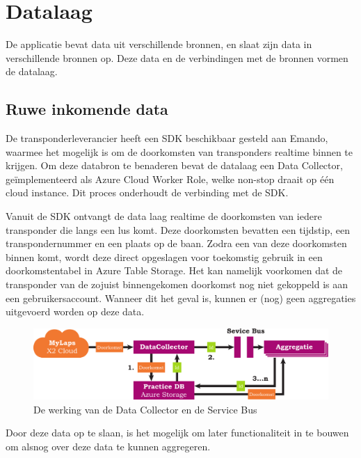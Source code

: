 \section{Datalaag}
De applicatie bevat data uit verschillende bronnen, en slaat zijn data in verschillende bronnen op. Deze data en de verbindingen met de bronnen vormen de datalaag.

\subsection{Ruwe inkomende data}

De transponderleverancier \mylaps heeft een SDK beschikbaar gesteld aan Emando, waarmee het mogelijk is om de doorkomsten van transponders realtime binnen te krijgen. Om deze databron te benaderen bevat de datalaag een Data Collector, geïmplementeerd als Azure Cloud Worker Role, welke non-stop draait op één cloud instance. Dit proces onderhoudt de verbinding met de \mylaps SDK.

Vanuit de \mylaps SDK ontvangt de data laag realtime de doorkomsten van iedere transponder die langs een lus komt. Deze doorkomsten bevatten een tijdstip, een transpondernummer en een plaats op de baan. Zodra een van deze doorkomsten binnen komt, wordt deze direct opgeslagen voor toekomstig gebruik in een doorkomstentabel in Azure Table Storage. Het kan namelijk voorkomen dat de transponder van de zojuist binnengekomen doorkomst nog niet gekoppeld is aan een gebruikersaccount. Wanneer dit het geval is, kunnen er (nog) geen aggregaties uitgevoerd worden op deze data.

\begin{figure}[ht]
  \begin{center}
  \includegraphics[width=\textwidth]{style/images/datacollector-flow}    
  \end{center}
  \caption{De werking van de Data Collector en de Service Bus}
  \label{fig:datacollector}
\end{figure}

Door deze data op te slaan, is het mogelijk om later functionaliteit in te bouwen om alsnog over deze data te kunnen aggregeren.

